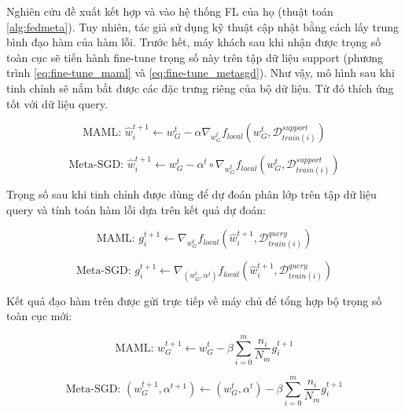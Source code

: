 Nghiên cứu \cite{chen2018federated} đề xuất kết hợp  và  vào hệ thống FL của họ (thuật toán \ref{alg:fedmeta}). Tuy nhiên, tác giả sử dụng kỹ thuật cập nhật bằng cách lấy trung bình đạo hàm của hàm lỗi. Trước hết, máy khách sau khi nhận được trọng số toàn cục sẽ tiến hành fine-tune trọng số này trên tập dữ liệu support (phương trình \ref{eq:fine-tune_maml} và \ref{eq:fine-tune_metasgd}). Như vậy, mô hình sau khi tinh chỉnh sẽ nắm bắt được các đặc trưng riêng của bộ dữ liệu. Từ đó thích ứng tốt với dữ liệu query.

\begin{dmath}
    \label{eq:fine-tune_maml}
    \text{MAML: } \hat{w}_i^{t+1} \gets w_G^t - \alpha\nabla_{w_G^t} f_{local}(w_G^t, \mathcal{D}_{train(i)}^{support})
\end{dmath}

\begin{dmath}
    \label{eq:fine-tune_metasgd}
    \text{Meta-SGD: } \hat{w}_i^{t+1} \gets w_G^t - \alpha^t \circ \nabla_{w_G^t} f_{local}(w_G^t, \mathcal{D}_{train(i)}^{support})
\end{dmath}

Trọng số sau khi tinh chỉnh được dùng để dự đoán phân lớp trên tập dữ liệu query và tính toán hàm lỗi dựa trên kết quả dự đoán:

\begin{dmath}
    \label{eq:grad_maml}
    \text{MAML: } g_i^{t+1} \gets \nabla_{w_G^t} f_{local}(\hat{w}_i^{t+1}, \mathcal{D}_{train(i)}^{query})
\end{dmath}

\begin{dmath}
    \label{eq:grad_metasgd}
    \text{Meta-SGD: } g_i^{t+1} \gets \nabla_{(w_G^t,\alpha^t)} f_{local}(\hat{w}_i^{t+1}, \mathcal{D}_{train(i)}^{query})
\end{dmath}

Kết quả đạo hàm trên được gửi trực tiếp về máy chủ để tổng hợp bộ trọng số toàn cục mới:

\begin{dmath}
    \label{eq:agg_fedmetamaml}
    \text{MAML: } w_G^{t+1} \gets w_G^t - \beta \sum_{i=0}^m \frac{n_i}{N_m} g_i^{t+1}
\end{dmath}

\begin{dmath}
    \text{Meta-SGD: } (w_G^{t+1}, \alpha^{t+1}) \gets (w_G^t, \alpha^t) - \beta \sum_{i=0}^m \frac{n_i}{N_m} g_i^{t+1}
\end{dmath}

